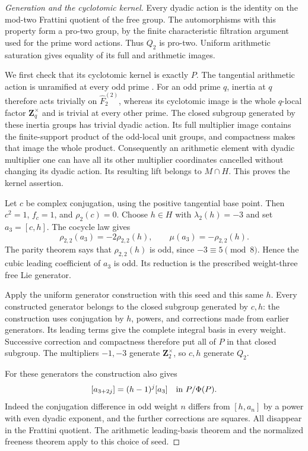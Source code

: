 \begin{proof}[Generation and the cyclotomic kernel]
Every dyadic action is the identity on the mod-two Frattini
quotient of the free group. The automorphisms with this property
form a pro-two group, by the finite characteristic filtration
argument used for the prime word actions. Thus \(Q_2\) is pro-two.
Uniform arithmetic saturation gives equality of its full and
arithmetic images.

We first check that its cyclotomic kernel is exactly \(P\).
The tangential arithmetic action is unramified at every odd
prime \cite[\S8.5, p.~151]{HainMatsumoto2003}.
For an odd prime \(q\), inertia at \(q\) therefore acts trivially
on \(\widehat F_2^{(2)}\), whereas its cyclotomic image is the
whole \(q\)-local factor \(\mathbf Z_q^\times\) and is trivial
at every other prime. The closed subgroup generated by these
inertia groups has trivial dyadic action. Its full multiplier
image contains the finite-support product of the odd-local
unit groups, and compactness makes that image the whole product.
Consequently an arithmetic element with dyadic multiplier one
can have all its other multiplier coordinates cancelled without
changing its dyadic action. Its resulting lift belongs to
\(M\cap H\). This proves the kernel assertion.

Let \(c\) be complex conjugation, using the positive tangential
base point. Then \(c^2=1\), \(f_c=1\), and \(\rho_2(c)=0\).
Choose \(h\in H\) with \(\lambda_2(h)=-3\) and set
\(a_3=[c,h]\). The cocycle law gives
\[
 \rho_{2,2}(a_3)=-2\rho_{2,2}(h),\qquad
 \mu(a_3)=-\rho_{2,2}(h).
\]
The parity theorem says that \(\rho_{2,2}(h)\) is odd, since
\(-3\equiv5\pmod8\). Hence the cubic leading coefficient of
\(a_3\) is odd. Its reduction is the prescribed weight-three
free Lie generator.

Apply the uniform generator construction with this seed and
this same \(h\). Every constructed generator belongs to the
closed subgroup generated by \(c,h\): the construction uses
conjugation by \(h\), powers, and corrections made from earlier
generators. Its leading terms give the complete integral basis
in every weight. Successive correction and compactness therefore
put all of \(P\) in that closed subgroup.
The multipliers \(-1,-3\) generate \(\mathbf Z_2^\times\), so
\(c,h\) generate \(Q_2\).

For these generators the construction also gives
\[
 [a_{3+2j}]=(h-1)^j[a_3]\quad\hbox{in }P/\Phi(P).
\]
Indeed the conjugation difference in odd weight \(n\) differs
from \([h,a_n]\) by a power with even dyadic exponent, and
the further corrections are squares. All disappear in the
Frattini quotient. The arithmetic leading-basis theorem and
the normalized freeness theorem apply to this choice of seed.
\end{proof}

